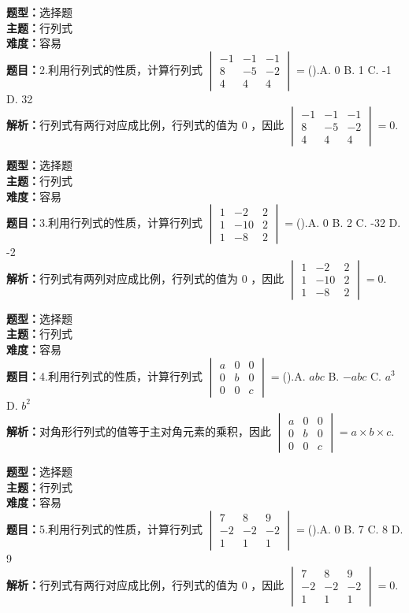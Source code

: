 \documentclass{ctexart}
\newenvironment{question}[5]{%
	\noindent\textbf{题型：}#1\\
	\textbf{主题：}#2\\
	\textbf{难度：}#3\\
	\textbf{题目：}#4\\
	\textbf{解析：}#5\\
	\vspace{1em}
}{}
\begin{document}
	\begin{question}
		{选择题}
		{行列式}
		{容易}
		{2.利用行列式的性质，计算行列式 $\begin{vmatrix}-1 & -1 & -1 \\ 8 & -5 & -2 \\ 4 & 4 & 4\end{vmatrix}=$().A. 0 B. 1 C. -1 D. 32}
		{行列式有两行对应成比例，行列式的值为 0 ，因此 $\begin{vmatrix}-1 & -1 & -1 \\ 8 & -5 & -2 \\ 4 & 4 & 4\end{vmatrix}=0$.}
	\end{question}
	
	\begin{question}
		{选择题}
		{行列式}
		{容易}
		{3.利用行列式的性质，计算行列式 $\begin{vmatrix}1 & -2 & 2 \\ 1 & -10 & 2 \\ 1 & -8 & 2\end{vmatrix}=$().A. 0 B. 2 C. -32 D. -2}
		{行列式有两列对应成比例，行列式的值为 0 ，因此 $\begin{vmatrix}1 & -2 & 2 \\ 1 & -10 & 2 \\ 1 & -8 & 2\end{vmatrix}=0$.}
	\end{question}
	
	\begin{question}
		{选择题}
		{行列式}
		{容易}
		{4.利用行列式的性质，计算行列式 $\begin{vmatrix}a & 0 & 0 \\ 0 & b & 0 \\ 0 & 0 & c\end{vmatrix}=$().A. $abc$ B. $-abc$ C. $a^3$ D. $b^2$}
		{对角形行列式的值等于主对角元素的乘积，因此 $\begin{vmatrix}a & 0 & 0 \\ 0 & b & 0 \\ 0 & 0 & c\end{vmatrix}=a \times b \times c$.}
	\end{question}
	
	\begin{question}
		{选择题}
		{行列式}
		{容易}
		{5.利用行列式的性质，计算行列式 $\begin{vmatrix}7 & 8 & 9 \\ -2 & -2 & -2 \\ 1 & 1 & 1\end{vmatrix}=$().A. 0 B. 7 C. 8 D. 9}
		{行列式有两行对应成比例，行列式的值为 0 ，因此 $\begin{vmatrix}7 & 8 & 9 \\ -2 & -2 & -2 \\ 1 & 1 & 1\end{vmatrix}=0$.}
	\end{question}
	
\end{document}
